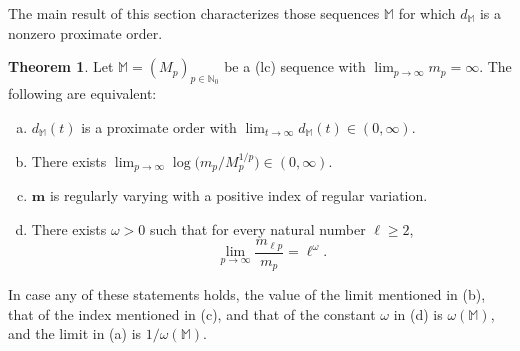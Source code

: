 \documentclass[11pt,a4paper]{article}
\theoremstyle{definition}
\newtheorem{theo}{Theorem}[section]
\def\oo{\infty}
\def\ri{\rightarrow}
\def\o{\omega}
\def\N{\mathbb{N}}
\def\M{\mathbb{M}}
\def\m{\boldsymbol{m}}
\begin{document}
The main result of this section characterizes those sequences $\M$ for which $d_{\M}$ is a nonzero proximate order.

\begin{theo}\label{theorem.charact.prox.order.nonzero}
Let $\M=(M_p)_{p\in\N_0}$ be a (lc) sequence with $\lim_{p\to\infty} m_p=\infty$. The following are equivalent:
\begin{enumerate}[(a)]
 \item $d_{\M}(t)$ is a proximate order with $\lim_{t\to\infty}d_{\M}(t)\in(0,\infty)$.
 \item There exists $\lim_{p\to\infty} \log\big(m_p/M_p^{1/p}\big)\in(0,\infty)$.
 \item $\m$ is regularly varying with a positive index of regular variation.
 \item There exists $\o>0$ such that for every natural number $\ell\geq 2$,
 $$\lim_{p\ri\oo} \frac{m_{\ell p}}{m_p}=\ell^\o.$$
\end{enumerate}
In case any of these statements holds, the value of the limit mentioned in (b), that of the index mentioned in (c), and that of the constant $\o$ in (d) is $\o(\M)$,
and the limit in (a) is $1/\o(\M)$.
\end{theo}
\end{document}
